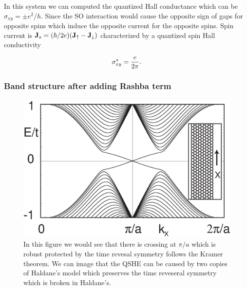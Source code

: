 \documentclass{beamer}
\begin{document}
\begin{frame}
 In this system we can computed the quantized Hall conductance which can be
 $\sigma_{xy}=\pm e^2/h$. Since the SO interaction would cause the opposite
 sign of gaps for opposite spins which induce the opposite current for the
 opposite spins. Spin current is ${\bf J}_s = (\hbar/2e)({\bf J}_\uparrow-
 {\bf J}_\downarrow)$ characterized by a quantized spin Hall conductivity

\begin{equation*}
\sigma^s_{xy}={e\over{2\pi}}.
\end{equation*}

\end{frame}

\begin{frame}
\frametitle{Band structure after adding Rashba term}
   \begin{figure}[htpb]
  \centering
  \includegraphics[width=0.7\linewidth]{fig1.eps}
  \caption{In this figure we would see that there is crossing at
  $\pi/a$ which is robust protected by the time revesal symmetry
follows the Kramer theorem. We can image that the QSHE can be caused by two
copies of Haldane's model which preserves the time reveseral symmetry which
is broken in Haldane's.}%
  \label{fig:fig1}
\end{figure}

\end{frame}

\end{document}
